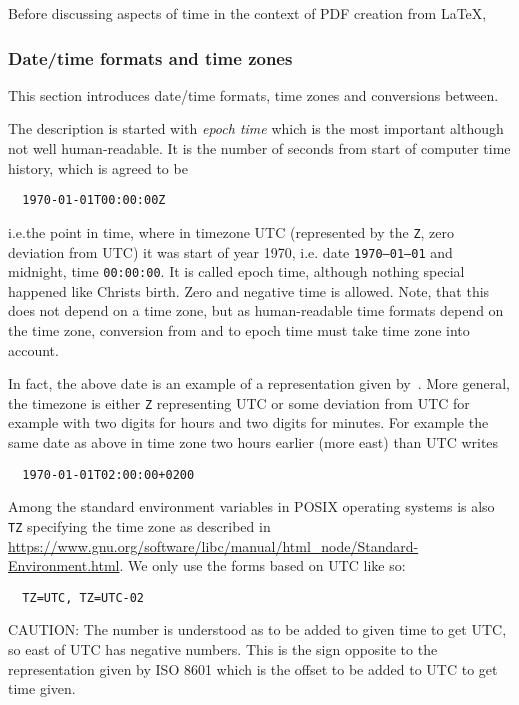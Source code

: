 \documentclass[a4paper, english]{article}%
\begin{document}
Before discussing aspects of time in the context of PDF creation from \LaTeX, 


\subsubsection{Date/time formats and time zones}\label{subsubsec:dateTimeZones}

This section introduces date/time formats, time zones and conversions between. 

The description is started with \emph{epoch time} 
which is the most important although not well human-readable. 
It is the number of seconds from start of computer time history, 
which is agreed to be 
%
\begin{verbatim}
  1970-01-01T00:00:00Z
\end{verbatim}
%
i.e.\@ the point in time, where in timezone UTC (represented by the \texttt Z, zero deviation from UTC) 
it was start of year 1970, i.e. date \texttt{1970--01--01} and midnight, time \texttt{00:00:00}. 
It is called epoch time, although nothing special happened like Christs birth. 
Zero and negative time is allowed. 
Note, that this does not depend on a time zone, 
but as human-readable time formats depend on the time zone, 
conversion from and to epoch time must take time zone into account. 

In fact, the above date is an example of a representation given by~\cite{ISO8601-1}. 
More general, the timezone is either \texttt Z representing UTC 
or some deviation from UTC for example with two digits for hours and two digits for minutes. 
For example the same date as above in time zone two hours earlier (more east) than UTC writes 
%
\begin{verbatim}
  1970-01-01T02:00:00+0200
\end{verbatim}

Among the standard environment variables in POSIX operating systems 
is also \texttt{TZ} specifying the time zone 
as described in \url{https://www.gnu.org/software/libc/manual/html_node/Standard-Environment.html}. 
We only use the forms based on UTC like so: 
%
\begin{verbatim}
  TZ=UTC, TZ=UTC-02
\end{verbatim}
%
CAUTION: The number is understood as to be added to given time to get UTC, 
so east of UTC has negative numbers. 
This is the sign opposite to the representation given by ISO 8601 
which is the offset to be added to UTC to get time given. 
\end{document}
